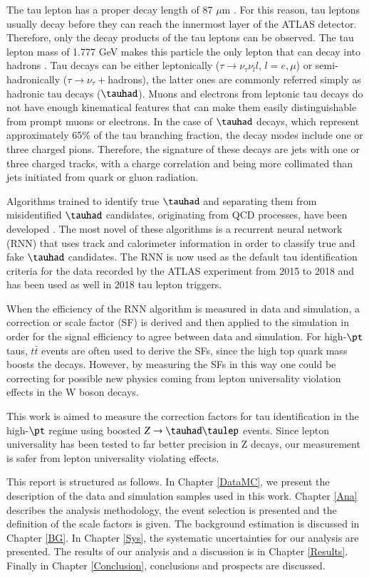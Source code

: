 The tau lepton has a proper decay length of 87 $\mu$m \cite{PhysRevD.98.030001}. For this reason, tau leptons usually decay before they can reach the innermost layer of the ATLAS detector. Therefore, only the decay products of the tau leptons can be observed. The tau lepton mass of 1.777 GeV makes this particle the only lepton that can decay into hadrons \cite{PhysRevD.98.030001}. Tau decays can be either leptonically ($\tau\to\nu_\tau\nu_l l$, $l=e,\mu$) or semi-hadronically ($\tau\to\nu_\tau+$hadrons), the latter ones are commonly referred simply as hadronic tau decays ($\tauhad$). Muons and electrons from leptonic tau decays do not have enough kinematical features that can make them easily distinguishable from prompt muons or electrons. In the case of $\tauhad$ decays, which represent approximately 65\% of the tau branching fraction, the decay modes include one or three charged pions. Therefore, the signature of these decays are jets with one or three charged tracks, with a charge correlation and being more collimated than jets initiated from quark or gluon radiation.

Algorithms trained to identify true $\tauhad$ and separating them from misidentified $\tauhad$  candidates, originating from QCD processes, have been developed \cite{Deutsch:2680523}. The most novel of these algorithms is a recurrent neural network (RNN) that uses track and calorimeter information in order to classify true and fake $\tauhad$ candidates. The RNN is now used as the default tau identification criteria for the data recorded by the ATLAS experiment from 2015 to 2018 and has been used as well in 2018 tau lepton triggers.

When the efficiency of the RNN algorithm is measured in data and simulation, a correction or scale factor (SF) is derived and then applied to the simulation in order for the signal efficiency to agree between data and simulation. For high-$\pt$ taus, $t\bar{t}$ events are often used to derive the SFs, since the high top quark mass boosts the decays. However, by measuring the SFs in this way one could be correcting for possible new physics coming from lepton universality violation effects in the W boson decays.

This work is aimed to measure the correction factors for tau identification in the high-$\pt$ regime using boosted $Z\to\tauhad\taulep$ events. Since lepton universality has been tested to far better precision in Z decays, our measurement is safer from lepton universality violating effects.

This report is structured as follows. In Chapter \ref{DataMC}, we present the description of the data and simulation samples used in this work. Chapter \ref{Ana}  describes the analysis methodology, the event selection is presented and the definition of the scale factors is given. The background estimation is discussed in Chapter \ref{BG}. In Chapter \ref{Sys}, the systematic uncertainties for our analysis are presented. The results of our analysis and a discussion is in Chapter \ref{Results}. Finally in Chapter \ref{Conclusion}, conclusions and prospects are discussed.
